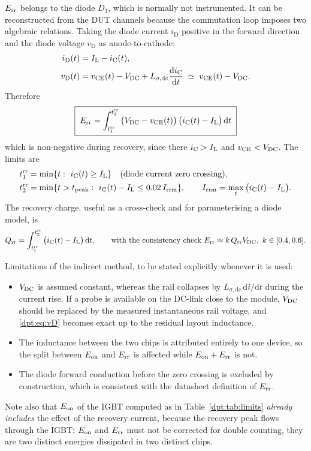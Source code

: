 $E_{\mathrm{rr}}$ belongs to the diode $D_1$, which is normally not instrumented. It can be
reconstructed from the DUT channels because the commutation loop imposes two algebraic
relations. Taking the diode current $i_{\mathrm{D}}$ positive in the forward direction and
the diode voltage $v_{\mathrm{D}}$ as anode-to-cathode:
\begin{align}
i_{\mathrm{D}}(t) &= I_{\mathrm{L}} - i_{\mathrm{C}}(t), \label{dpt:eq:iD}\\
v_{\mathrm{D}}(t) &= v_{\mathrm{CE}}(t) - V_{\mathrm{DC}} + L_{\sigma,\mathrm{dc}}\frac{\mathrm{d}i_{\mathrm{C}}}{\mathrm{d}t}
\;\simeq\; v_{\mathrm{CE}}(t)-V_{\mathrm{DC}} . \label{dpt:eq:vD}
\end{align}
Therefore
\begin{equation}
\boxed{\;
E_{\mathrm{rr}} = \int_{t_1^{\mathrm{rr}}}^{t_2^{\mathrm{rr}}}
\big(V_{\mathrm{DC}}-v_{\mathrm{CE}}(t)\big)\,\big(i_{\mathrm{C}}(t)-I_{\mathrm{L}}\big)\,\mathrm{d}t \;}
\label{dpt:eq:Err}
\end{equation}
which is non-negative during recovery, since there $i_{\mathrm{C}}>I_{\mathrm{L}}$ and $v_{\mathrm{CE}}<V_{\mathrm{DC}}$. The limits
are
\begin{align}
t_1^{\mathrm{rr}} &= \min\{t:\ i_{\mathrm{C}}(t)\ge I_{\mathrm{L}}\} \quad(\text{diode current zero crossing}),\\
t_2^{\mathrm{rr}} &= \min\{t>t_{\mathrm{peak}}:\ i_{\mathrm{C}}(t)-I_{\mathrm{L}} \le 0.02\,I_{\mathrm{rrm}}\},
\qquad I_{\mathrm{rrm}}=\max_t\big(i_{\mathrm{C}}(t)-I_{\mathrm{L}}\big).
\end{align}
The recovery charge, useful as a cross-check and for parameterising a diode model, is
\begin{equation}
Q_{\mathrm{rr}}=\int_{t_1^{\mathrm{rr}}}^{t_2^{\mathrm{rr}}}\big(i_{\mathrm{C}}(t)-I_{\mathrm{L}}\big)\,\mathrm{d}t,
\qquad \text{with the consistency check } E_{\mathrm{rr}} \approx k\,Q_{\mathrm{rr}}V_{\mathrm{DC}},\ k\in[0.4,0.6].
\end{equation}

Limitations of the indirect method, to be stated explicitly whenever it is used:
\begin{itemize}
\item $V_{\mathrm{DC}}$ is assumed constant, whereas the rail collapses by
$L_{\sigma,\mathrm{dc}}\,\mathrm{d}i/\mathrm{d}t$ during the current rise. If a probe is
available on the DC-link close to the module, $V_{\mathrm{DC}}$ should be replaced by the measured
instantaneous rail voltage, and \eqref{dpt:eq:vD} becomes exact up to the residual layout
inductance.
\item The inductance between the two chips is attributed entirely to one device, so the
split between $E_{\mathrm{on}}$ and $E_{\mathrm{rr}}$ is affected while $E_{\mathrm{on}}+E_{\mathrm{rr}}$ is not.
\item The diode forward conduction before the zero crossing is excluded by construction,
which is consistent with the datasheet definition of $E_{\mathrm{rr}}$.
\end{itemize}
Note also that $E_{\mathrm{on}}$ of the IGBT computed as in Table~\ref{dpt:tab:limits} \emph{already
includes} the effect of the recovery current, because the recovery peak flows through the
IGBT: $E_{\mathrm{on}}$ and $E_{\mathrm{rr}}$ must not be corrected for double counting, they are two distinct
energies dissipated in two distinct chips.

